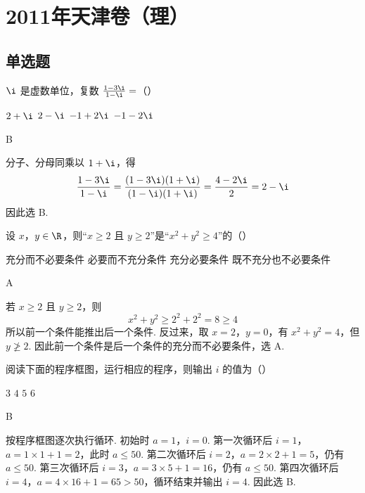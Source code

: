 \chapter{2011年天津卷（理）}

\section{单选题}

\begin{problem}
\(\i\) 是虚数单位，复数 \( \frac{1-3\i}{1-\i}= \)（\quad）

\choices
    {\(2 + \i\)}
    {\(2 - \i\)}
    {\(-1 + 2\i\)}
    {\(-1 - 2\i\)}
\begin{answer}
B
\end{answer}

\begin{solution}
分子、分母同乘以 \(1+\i\)，得
\[
\frac{1-3\i}{1-\i}
=\frac{(1-3\i)(1+\i)}{(1-\i)(1+\i)}
=\frac{4-2\i}{2}
=2-\i
\]
因此选 B.
\end{solution}
\end{problem}

\begin{problem}
设 \(x\)，\(y \in \R\)，则“\(x \geqslant 2\) 且 \(y \geqslant 2\)”是“\(x^2 + y^2 \geqslant 4\)”的（\quad）

\choices
    {充分而不必要条件}
    {必要而不充分条件}
    {充分必要条件}
    {既不充分也不必要条件}
\begin{answer}
A
\end{answer}

\begin{solution}
若 \(x\geqslant2\) 且 \(y\geqslant2\)，则
\[
x^2+y^2\geqslant 2^2+2^2=8\geqslant4
\]
所以前一个条件能推出后一个条件. 反过来，取 \(x=2\)，\(y=0\)，有 \(x^2+y^2=4\)，但 \(y\not\geqslant2\). 因此前一个条件是后一个条件的充分而不必要条件，选 A.
\end{solution}
\end{problem}

\begin{problem}
阅读下面的程序框图，运行相应的程序，则输出 \(i\) 的值为（\quad）


\choices
    {\(3\)}
    {\(4\)}
    {\(5\)}
    {\(6\)}
\begin{answer}
B
\end{answer}

\begin{solution}
按程序框图逐次执行循环. 初始时 \(a=1\)，\(i=0\). 第一次循环后
\(i=1\)，\(a=1\times1+1=2\)，此时 \(a\leqslant50\). 第二次循环后
\(i=2\)，\(a=2\times2+1=5\)，仍有 \(a\leqslant50\). 第三次循环后
\(i=3\)，\(a=3\times5+1=16\)，仍有 \(a\leqslant50\). 第四次循环后
\(i=4\)，\(a=4\times16+1=65>50\)，循环结束并输出 \(i=4\). 因此选 B.
\end{solution}
\end{problem}

